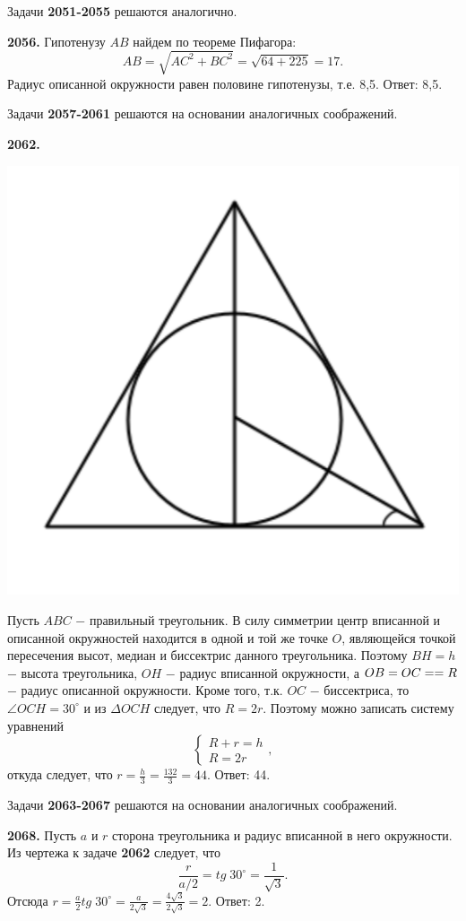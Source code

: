 Задачи \textbf{2051-2055} решаются аналогично.

\textbf{2056.} Гипотенузу $AB$ найдем по теореме Пифагора:
\[
AB = \sqrt{AC^2+BC^2} = \sqrt{64+225} = 17.
\]
Радиус описанной окружности равен половине гипотенузы, т.е. 8,5. \newline \null \hspace*{\fill} Ответ: 8,5.


Задачи \textbf{2057-2061} решаются на основании аналогичных соображений.

\textbf{2062.} 

{\centering \includegraphics[width=0.4\linewidth]{Geometry/Content/36.png}
	
}

Пусть $ABC$ $-$ правильный треугольник. В силу симметрии центр вписанной и описанной окружностей находится в одной и той же точке $O$, являющейся точкой пересечения высот, медиан и биссектрис данного треугольника. Поэтому $BH=h$ $-$ высота треугольника, $OH$ $-$ радиус вписанной окружности, а $OB=OC =\linebreak= R$ $-$ радиус описанной окружности. Кроме того, т.к. $OC$ $-$ биссектриса, то $\angle OCH = 30^\circ$ и из $\Delta OCH$ следует, что $R = 2r$. Поэтому можно записать систему уравнений
\[
\begin{cases}
	R + r = h \\
	R = 2r
\end{cases},
\]
откуда следует, что $r = \frac{h}{3} = \frac{132}{3} = 44.$ \newline \null \hspace*{\fill} Ответ: 44.

Задачи \textbf{2063-2067}  решаются на основании аналогичных соображений.

\textbf{2068.} Пусть $a$ и $r$ сторона треугольника и радиус вписанной в него окружности.  Из чертежа к задаче \textbf{2062} следует, что 
\[
\frac{r}{a/2}  =tg\;30^\circ = \frac{1}{\sqrt{3}}.
\]  
Отсюда $r = \frac{a}{2} tg \; 30^\circ = \frac{a}{2\sqrt{3}} = \frac{4\sqrt{3}}{2\sqrt{3}} = 2.$ \newline \null \hspace*{\fill} Ответ: 2.


